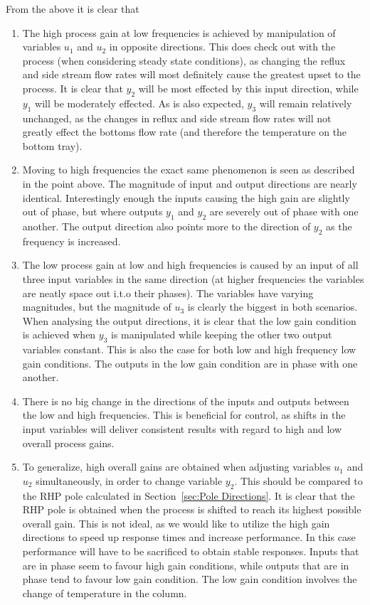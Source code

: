 From the above it is clear that

\begin{enumerate}
	\item The high process gain at low frequencies is achieved by manipulation of variables $u_1$ and $u_2$ in opposite directions. This does check out with the process (when considering steady state conditions), as changing the reflux and side stream flow rates will most definitely cause the greatest upset to the process. It is clear that $y_2$ will be most effected by this input direction, while $y_1$ will be moderately effected. As is also expected, $y_3$ will remain relatively unchanged, as the changes in reflux and side stream flow rates will not greatly effect the bottoms flow rate (and therefore the temperature on the bottom tray).
	\item  Moving to high frequencies the exact same phenomenon is seen as described in the point above. The magnitude of input and output directions are nearly identical. Interestingly enough the inputs causing the high gain are slightly out of phase, but where outputs $y_1$ and $y_2$ are severely out of phase with one another. The output direction also points more to the direction of $y_2$ as the frequency is increased.
	\item The low process gain at low and high frequencies is caused by an input of all three input variables in the same direction (at higher frequencies the variables are neatly space out i.t.o their phases). The variables have varying magnitudes, but the magnitude of $u_3$ is clearly the biggest in both scenarios. When analysing the output directions, it is clear that the low gain condition is achieved when $y_3$ is manipulated while keeping the other two output variables constant. This is also the case for both low and high frequency low gain conditions. The outputs in the low gain condition are in phase with one another.
	\item There is no big change in the directions of the inputs and outputs between the low and high frequencies. This is beneficial for control, as shifts in the input variables will deliver consistent results with regard to high and low overall process gains.
	\item To generalize, high overall gains are obtained when adjusting variables $u_1$ and $u_2$ simultaneously, in order to change variable $y_2$. This should be compared to the RHP pole calculated in Section~\ref{sec:Pole Directions}. It is clear that the RHP pole is obtained when the process is shifted to reach its highest possible overall gain. This is not ideal, as we would like to utilize the high gain directions to speed up response times and increase performance. In this case performance will have to be sacrificed to obtain stable responses. Inputs that are in phase seem to favour high gain conditions, while outputs that are in phase tend to favour low gain condition. The low gain condition involves the change of temperature in the column. 
	
\end{enumerate}

